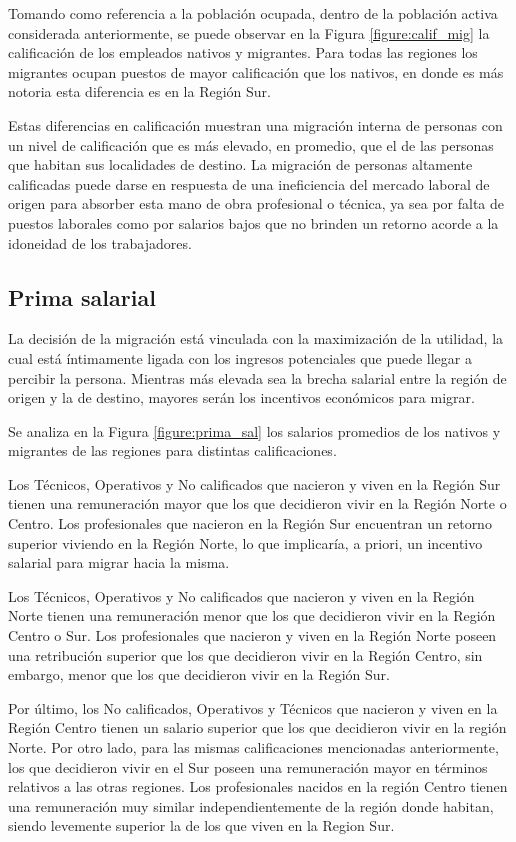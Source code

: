 \documentclass[12pt,a4paper]{article}
\begin{document}
Tomando como referencia a la población ocupada, dentro de la población activa considerada anteriormente, se puede observar en la Figura \ref{figure:calif_mig} la calificación de los empleados nativos y migrantes. Para todas las regiones los migrantes ocupan puestos de mayor calificación que los nativos, en donde es más notoria esta diferencia es en la Región Sur.

Estas diferencias en calificación muestran una migración interna de personas con un nivel de calificación que es más elevado, en promedio, que el de las personas que habitan sus localidades de destino. La migración de personas altamente calificadas puede darse en respuesta de una ineficiencia del mercado laboral de origen para absorber esta mano de obra profesional o técnica, ya sea por falta de puestos laborales como por salarios bajos que no brinden un retorno acorde a la idoneidad de los trabajadores.

\subsection{Prima salarial}
La decisión de la migración está vinculada con la maximización de la utilidad, la cual está íntimamente ligada con los ingresos potenciales que puede llegar a percibir la persona. Mientras más elevada sea la brecha salarial entre la región de origen y la de destino, mayores serán los incentivos económicos para migrar.

Se analiza en la Figura \ref{figure:prima_sal} los salarios promedios de los nativos y migrantes de las regiones para distintas calificaciones. 

Los Técnicos, Operativos y No calificados que nacieron y viven en la Región Sur tienen una remuneración mayor que los que decidieron vivir en la Región Norte o Centro. Los profesionales que nacieron en la Región Sur encuentran un retorno superior viviendo en la Región Norte, lo que implicaría, a priori, un incentivo salarial para migrar hacia la misma.

Los Técnicos, Operativos y No calificados que nacieron y viven en la Región Norte tienen una remuneración menor que los que decidieron vivir en la Región Centro o Sur. Los profesionales que nacieron y viven en la Región Norte poseen una retribución superior que los que decidieron vivir en la Región Centro, sin embargo, menor que los que decidieron vivir en la Región Sur.

Por último, los No calificados, Operativos y Técnicos que nacieron y viven en la Región Centro tienen un salario superior que los que decidieron vivir en la región Norte. Por otro lado, para las mismas calificaciones mencionadas anteriormente, los que decidieron vivir en el Sur poseen una remuneración mayor en términos relativos a las otras regiones. Los profesionales nacidos en la región Centro tienen una remuneración muy similar independientemente de la región donde habitan, siendo levemente superior la de los que viven en la Region Sur.
\end{document}
